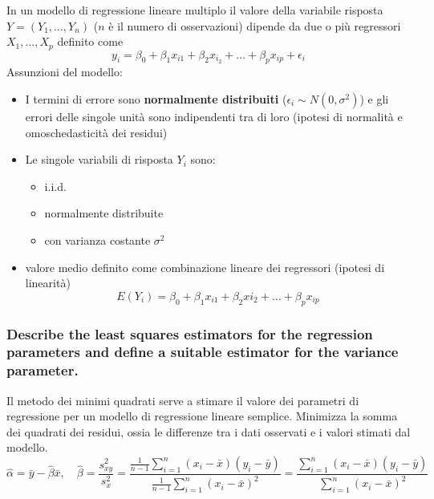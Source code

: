 \documentclass[
]{article}
\begin{document}
In un modello di regressione lineare multiplo il valore della variabile
risposta \(Y = (Y_1, \dots, Y_n)\) (\(n\) è il numero di osservazioni)
dipende da due o più regressori \(X_1,\dots,X_p\) definito come
\[ y_i = \beta_0 + \beta_1 x_{i1} + \beta_2 x_{i_2} + \dots + \beta_p x_{ip} + \epsilon_i \]
Assunzioni del modello:

\begin{itemize}
\item
  I termini di errore sono \textbf{normalmente distribuiti}
  (\(\epsilon_i \sim N(0, \sigma^2)\)) e gli errori delle singole unità
  sono indipendenti tra di loro (ipotesi di normalità e omoschedasticità
  dei residui)
\item
  Le singole variabili di risposta \(Y_i\) sono:

  \begin{itemize}
  \item
    i.i.d.
  \item
    normalmente distribuite
  \item
    con varianza costante \(\sigma^2\)
  \end{itemize}
\item
  valore medio definito come combinazione lineare dei regressori
  (ipotesi di linearità)
  \[ E(Y_i) = \beta_0 + \beta_1 x_{i1} + \beta_2 x{i_2} + \dots + \beta_p x_{ip} \]
\end{itemize}

\hypertarget{describe-the-least-squares-estimators-for-the-regression-parameters-and-define-a-suitable-estimator-for-the-variance-parameter.}{%
\subsubsection{Describe the least squares estimators for the regression
parameters and define a suitable estimator for the variance
parameter.}\label{describe-the-least-squares-estimators-for-the-regression-parameters-and-define-a-suitable-estimator-for-the-variance-parameter.}}

Il metodo dei minimi quadrati serve a stimare il valore dei parametri di
regressione per un modello di regressione lineare semplice. Minimizza la
somma dei quadrati dei residui, ossia le differenze tra i dati osservati
e i valori stimati dal modello.
\[ \hat{\alpha} = \bar{y} - \hat{\beta}\bar{x}, \quad \hat{\beta} = \frac{s_{xy}^2}{s_x^2} = \frac{\frac{1}{n-1}\sum_{i=1}^n (x_i - \bar{x})(y_i - \bar{y})}{\frac{1}{n-1}\sum_{i=1}^{n} (x_i - \bar{x})^2} = \frac{\sum_{i=1}^n (x_i - \bar{x})(y_i - \bar{y})}{\sum_{i=1}^{n} (x_i - \bar{x})^2}\]
\end{document}
